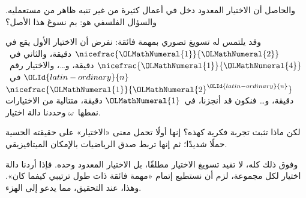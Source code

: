 \documentclass[../../../include/open-logic-section]{subfiles}
\begin{document}
والحاصل أن الاختيار المعدود دخل في أعمال كثيرة من غير تنبه ظاهر من
مستعمليه. والسؤال الفلسفي هو: بم نسوغ هذا الأصل؟

وقد يلتمس له تسويغ تصوري بمهمة فائقة: نفرض أن الاختيار الأول يقع في
$\nicefrac{{\OLMathNumeral{1}}}{{\OLMathNumeral{2}}}$ دقيقة، والثاني في~$\nicefrac{{\OLMathNumeral{1}}}{{\OLMathNumeral{4}}}$ دقيقة،
و\dots، والاختيار رقم~${\OLId{latin-ordinary}{n}}$ في~$\nicefrac{{\OLMathNumeral{1}}}{{\OLMathNumeral{2}}^{\OLId{latin-ordinary}{n}}}$ دقيقة، و\dots\@
فنكون قد أنجزنا، في~${\OLMathNumeral{1}}$ دقيقة، متتالية من الاختيارات نمطها~$\omega$
وحددنا دالة اختيار.

لكن ماذا تثبت تجربة فكرية كهذه؟ إنها أولًا تحمل معنى «الاختيار» على
حقيقته الحسية حملًا شديدًا؛ ثم إنها تربط صدق الرياضيات بالإمكان
الميتافيزيقي.

وفوق ذلك كله، لا تفيد تسويغ الاختيار مطلقًا، بل الاختيار المعدود وحده.
فإذا أردنا دالة اختيار لكل مجموعة، لزم أن نستطيع إتمام «مهمة فائقة ذات
طول ترتيبي كيفما كان». وهذا، عند التحقيق، مما يدعو إلى الهزء.
\end{document}
